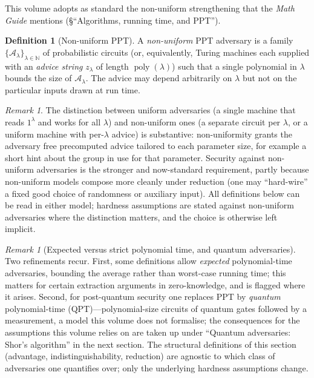 \documentclass[11pt,a4paper]{article}
\theoremstyle{definition}
\newtheorem{definition}[theorem]{Definition}
\theoremstyle{remark}
\newtheorem{remark}[theorem]{Remark}
\newcommand{\N}{\ensuremath{\mathbb{N}}}
\DeclareMathOperator{\poly}{poly}
\begin{document}
This volume adopts as standard the non-uniform strengthening that the
\emph{Math Guide} mentions (\S``Algorithms, running time, and PPT'').

\begin{definition}[Non-uniform PPT]\label{model:def:nonuniform}
A \emph{non-uniform} PPT adversary is a family
\(\{\mathcal{A}_\lambda\}_{\lambda\in\N}\) of probabilistic circuits
(or, equivalently, Turing machines each supplied with an \emph{advice
string} \(z_\lambda\) of length \(\poly(\lambda)\)) such that a single
polynomial in \(\lambda\) bounds the size of \(\mathcal{A}_\lambda\).
The advice may depend arbitrarily on \(\lambda\) but not on the
particular inputs drawn at run time.
\end{definition}

\begin{remark}\label{model:rem:uniform-vs-nonuniform}
The distinction between uniform adversaries (a single machine that
reads \(1^\lambda\) and works for all \(\lambda\)) and non-uniform
ones (a separate circuit per \(\lambda\), or a uniform machine with
per-\(\lambda\) advice) is substantive: non-uniformity grants the
adversary free precomputed advice tailored to each parameter size, for
example a short hint about the group in use for that parameter.
Security against non-uniform adversaries is the stronger and
now-standard requirement, partly because non-uniform models compose
more cleanly under reduction (one may ``hard-wire'' a fixed good
choice of randomness or auxiliary input). All definitions below can be
read in either model; hardness assumptions are stated against
non-uniform adversaries where the distinction matters, and the choice
is otherwise left implicit.
\end{remark}

\begin{remark}[Expected versus strict polynomial time, and quantum
adversaries]\label{model:rem:variants}
Two refinements recur. First, some definitions allow \emph{expected}
polynomial-time adversaries, bounding the average rather than
worst-case running time; this matters for certain extraction arguments
in zero-knowledge, and is flagged where it arises. Second, for
post-quantum security one replaces PPT by \emph{quantum}
polynomial-time (QPT)---polynomial-size circuits of quantum gates
followed by a measurement, a model this volume does not formalise;
the consequences for the assumptions this volume relies on are taken
up under ``Quantum adversaries: Shor's algorithm'' in the
next section. The structural definitions of this section (advantage,
indistinguishability, reduction) are agnostic to which class of
adversaries one quantifies over; only the underlying hardness
assumptions change.
\end{remark}
\end{document}
